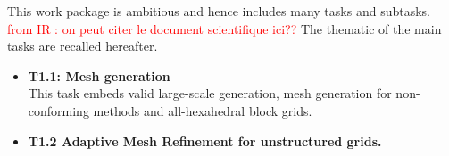 This work package is ambitious and hence includes many tasks and subtasks. \textcolor{red}{from IR : on peut citer le document scientifique ici??} The thematic of the main tasks are recalled hereafter.
\begin{itemize}
    \item {\bf T1.1: Mesh generation}\\
    This task embeds valid large-scale generation, mesh generation for non-conforming methods and all-hexahedral block grids.
    \item {\bf T1.2 Adaptive Mesh Refinement for unstructured grids.} 

\end{itemize}
